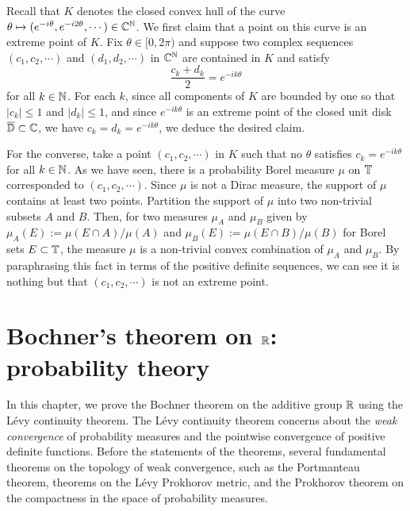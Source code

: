 \documentclass[a4paper]{article}
\begin{document}
\begin{pf}
Recall that $K$ denotes the closed convex hull of the curve $\theta\mapsto(e^{-i\theta},e^{-i2\theta},\cdots)\in\mathbb{C}^{\mathbb{N}}$.
We first claim that a point on this curve is an extreme point of $K$.
Fix $\theta\in[0,2\pi)$ and suppose two complex sequences $(c_1,c_2,\cdots)$ and $(d_1,d_2,\cdots)$ in $\mathbb{C}^{\mathbb{N}}$ are contained in $K$ and satisfy
\[\frac{c_k+d_k}2=e^{-ik\theta}\]
for all $k\in\mathbb{N}$.
For each $k$, since all components of $K$ are bounded by one so that $|c_k|\le1$ and $|d_k|\le1$, and since $e^{-ik\theta}$ is an extreme point of the closed unit disk $\overline{\mathbb{D}}\subset\mathbb{C}$, we have $c_k=d_k=e^{-ik\theta}$, we deduce the desired claim.

For the converse, take a point $(c_1,c_2,\cdots)$ in $K$ such that no $\theta$ satisfies $c_k=e^{-ik\theta}$ for all $k\in\mathbb{N}$.
As we have seen, there is a probability Borel measure $\mu$ on $\mathbb{T}$ corresponded to $(c_1,c_2,\cdots)$.
Since $\mu$ is not a Dirac measure, the support of $\mu$ contains at least two points.
Partition the support of $\mu$ into two non-trivial subsets $A$ and $B$.
Then, for two measures $\mu_A$ and $\mu_B$ given by $\mu_A(E):=\mu(E\cap A)/\mu(A)$ and $\mu_B(E):=\mu(E\cap B)/\mu(B)$ for Borel sets $E\subset\mathbb{T}$, the measure $\mu$ is a non-trivial convex combination of $\mu_A$ and $\mu_B$.
By paraphrasing this fact in terms of the positive definite sequences, we can see it is nothing but that $(c_1,c_2,\cdots)$ is not an extreme point.
\end{pf}















\newpage
\section{Bochner's theorem on $\mathbb{R}$: probability theory}

In this chapter, we prove the Bochner theorem on the additive group $\mathbb{R}$ using the L\'evy continuity theorem.
The L\'evy continuity theorem concerns about the \emph{weak convergence} of probability measures and the pointwise convergence of positive definite functions.
Before the statements of the theorems, several fundamental theorems on the topology of weak convergence, such as the Portmanteau theorem, theorems on the L\'evy Prokhorov metric, and the Prokhorov theorem on the compactness in the space of probability measures.
\end{document}
